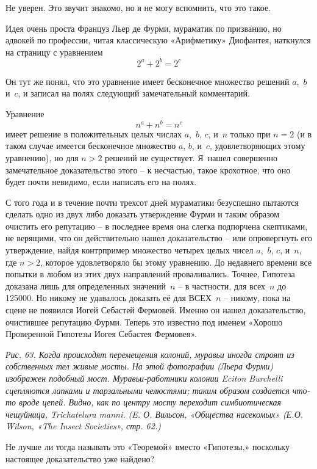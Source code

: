 \documentclass[../main.tex]{subfiles}
\begin{document}
\begin{dialogue}
 Не уверен. Это звучит знакомо, но я не могу вспомнить, что это такое.

 Идея очень проста Француз Льер де Фурми, мураматик по призванию, но адвокей по профессии, читая классическую «Арифметику» Диофантея, наткнулся на страницу с уравнением
\[
    2^{a} + 2^{b} = 2^{c}
\]

Он тут же понял, что это уравнение имеет бесконечное множество решений $a$,~$b$ и~$c$, и записал на полях следующий замечательный комментарий.

Уравнение
\[
    n^{a} + n^{b} = n^{c}
\]
имеет решение в положительных целых числах $a$,~$b$, $c$, и~$n$ только при $n = 2$ (и в таком случае имеется бесконечное множество $a$, $b$, и~$c$, удовлетворяющих этому уравнению), но для $n > 2$ решений не существует. Я~нашел совершенно замечательное доказательство этого \--- к несчастью, такое крохотное, что оно будет почти невидимо, если написать его на полях.

С того года и в течение почти трехсот дней мураматики безуспешно пытаются сделать одно из двух либо доказать утверждение Фурми и таким образом очистить его репутацию \--- в последнее время она слегка подпорчена скептиками, не верящими, что он действительно нашел доказательство \--- или опровергнуть его утверждение, найдя контрпример множество четырех целых чисел $a$,~$b$, $c$, и~$n$, где $n > 2$, которое удовлетворяло бы этому уравнению. До недавнего времени все попытки в любом из этих двух направлений проваливались. Точнее, Гипотеза доказана лишь для определенных значений~$n$ \--- в частности, для всех~$n$ до \num{125 000}. Но никому не удавалось доказать её для ВСЕХ~$n$ \--- никому, пока на сцене не появился Иогей Себастей Фермовей. Именно он нашел доказательство, очистившее репутацию Фурми. Теперь это известно под именем «Хорошо Проверенной Гипотезы Иогея Себастея Фермовея».

\emph{Рис. 63. Когда происходят перемещения колоний, муравьи иногда строят из собственных тел живые мосты. На этой фотографии (Льера Фурми) изображен подобный мост. Муравьи-работники колонии Eciton Burchelli сцепляются лапками и тарзальными челюстями; таким образом создается что-то вроде цепей. Видно, как по центру мосту переходит симбиотическая чешуйница, Trichatelura manni. (E. О. Вильсон, «Общества насекомых» (Е.О. Wilson, «The Insect Societies», стр. 62.)}

 Не лучше ли тогда называть это «Теоремой» вместо «Гипотезы,» поскольку настоящее доказательство уже найдено?


\end{dialogue}
\end{document}
